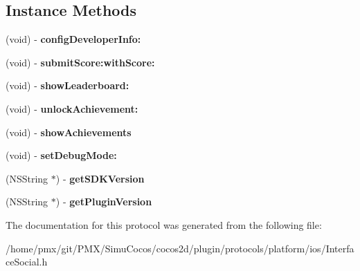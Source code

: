 \subsection*{Instance Methods}
\begin{DoxyCompactItemize}
\item 
\mbox{\label{protocolInterfaceSocial_01-p_a9bf83bead778c5b90325efd9ffc83dc6}} 
(void) -\/ {\bfseries config\+Developer\+Info\+:}
\item 
\mbox{\label{protocolInterfaceSocial_01-p_a18369c688fcecbb00de6aa57eac6a2c8}} 
(void) -\/ {\bfseries submit\+Score\+:with\+Score\+:}
\item 
\mbox{\label{protocolInterfaceSocial_01-p_a15cb69456408929c44680532fd5fbd5e}} 
(void) -\/ {\bfseries show\+Leaderboard\+:}
\item 
\mbox{\label{protocolInterfaceSocial_01-p_a390a37ecad2060b60569e288be1cc0e4}} 
(void) -\/ {\bfseries unlock\+Achievement\+:}
\item 
\mbox{\label{protocolInterfaceSocial_01-p_a8e24c471d9b8dcd1fe984611b51cc676}} 
(void) -\/ {\bfseries show\+Achievements}
\item 
\mbox{\label{protocolInterfaceSocial_01-p_a4fe037908de128215e5c262737b40476}} 
(void) -\/ {\bfseries set\+Debug\+Mode\+:}
\item 
\mbox{\label{protocolInterfaceSocial_01-p_a32cacb6d3702756973bf9efc418dece7}} 
(N\+S\+String $\ast$) -\/ {\bfseries get\+S\+D\+K\+Version}
\item 
\mbox{\label{protocolInterfaceSocial_01-p_ae44de66a845de1f58c2491cb7fb53d90}} 
(N\+S\+String $\ast$) -\/ {\bfseries get\+Plugin\+Version}
\end{DoxyCompactItemize}


The documentation for this protocol was generated from the following file\+:\begin{DoxyCompactItemize}
\item 
/home/pmx/git/\+P\+M\+X/\+Simu\+Cocos/cocos2d/plugin/protocols/platform/ios/Interface\+Social.\+h\end{DoxyCompactItemize}
